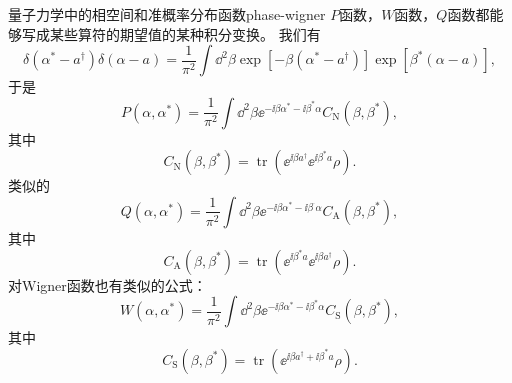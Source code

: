 \begin{back}{量子力学中的相空间和准概率分布函数}{phase-wigner}
    $P$函数，$W$函数，$Q$函数都能够写成某些算符的期望值的某种积分变换。
    我们有
    \begin{equation}
        \delta\left(\alpha^{*}-a^{\dagger}\right) \delta(\alpha-a) =\frac{1}{\pi^{2}} \int \dd^{2} \beta \exp \left[-\beta\left(\alpha^{*}-a^{\dagger}\right)\right] \exp \left[\beta^{*}(\alpha-a)\right],
    \end{equation}
    于是
    \begin{equation}
        P\left(\alpha, \alpha^{*}\right)=\frac{1}{\pi^{2}} \int \dd^{2} \beta \ee^{- \ii \beta \alpha^{*}- \ii \beta^{*} \alpha} C_\text{N}\left(\beta, \beta^{*}\right),
    \end{equation}
    其中
    \begin{equation}
        C_\text{N}\left(\beta, \beta^{*}\right)=\operatorname{tr}\left(\ee^{\ii \beta a^{\dagger}} \ee^{\ii \beta^{*} a} \rho\right).
    \end{equation}
    类似的
    \begin{equation}
        Q\left(\alpha, \alpha^{*}\right)=\frac{1}{\pi^{2}} \int \dd^{2} \beta \ee^{- \ii \beta \alpha^{*}- \ii \beta^{\cdot} \alpha} C_\text{A}\left(\beta, \beta^{*}\right),
    \end{equation}
    其中
    \begin{equation}
        C_\text{A}\left(\beta, \beta^{*}\right)=\operatorname{tr}\left(\ee^{\ii \beta^{*} a} \ee^{\ii \beta a^{\dagger}} \rho\right).
    \end{equation}
    对Wigner函数也有类似的公式：
    \begin{equation}
        W\left(\alpha, \alpha^{*}\right)=\frac{1}{\pi^{2}} \int \dd^{2} \beta \ee^{-\ii \beta \alpha^{*}- \ii \beta^{*} \alpha} C_\text{S}\left(\beta, \beta^{*}\right),
    \end{equation}
    其中
    \begin{equation}
        C_\text{S}\left(\beta, \beta^{*}\right)=\operatorname{tr}\left(\ee^{\ii \beta a^{\dagger}+ \ii \beta^{*} a} \rho\right).
    \end{equation}
\end{back}